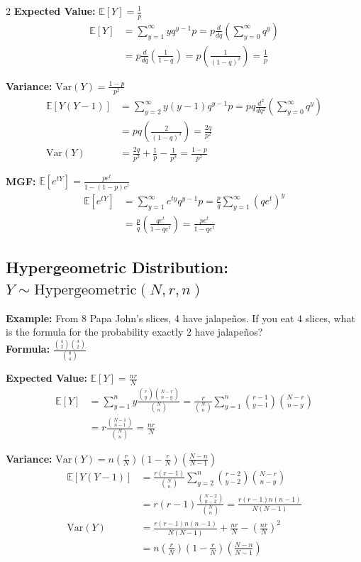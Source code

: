 \documentclass[11pt, letterpaper]{article}
\theoremstyle{definition}
\theoremstyle{remark}
\newcommand{\E}{\mathbb{E}}
\begin{document}
\begin{multicols*}{2}
\textbf{Expected Value:} $\E[Y] = \frac{1}{p}$
\begin{align*}
\E[Y] &= \sum_{y=1}^{\infty} y q^{y-1} p = p \frac{d}{dq} \left( \sum_{y=0}^{\infty} q^y \right) \\
&= p \frac{d}{dq} \left( \frac{1}{1-q} \right) = p \left( \frac{1}{(1-q)^2} \right) = \frac{1}{p}
\end{align*}

\textbf{Variance:} $\text{Var}(Y) = \frac{1-p}{p^2}$
\begin{align*}
\E[Y(Y-1)] &= \sum_{y=2}^{\infty} y(y-1) q^{y-1} p = pq \frac{d^2}{dq^2} \left( \sum_{y=0}^{\infty} q^y \right) \\
&= pq \left( \frac{2}{(1-q)^3} \right) = \frac{2q}{p^2} \\
\text{Var}(Y) &= \frac{2q}{p^2} + \frac{1}{p} - \frac{1}{p^2} = \frac{1-p}{p^2}
\end{align*}

\textbf{MGF:} $\E[e^{tY}] = \frac{pe^t}{1-(1-p)e^t}$
\begin{align*}
\E[e^{tY}] &= \sum_{y=1}^{\infty} e^{ty} q^{y-1} p = \frac{p}{q} \sum_{y=1}^{\infty} (qe^t)^y \\
&= \frac{p}{q} \left( \frac{qe^t}{1-qe^t} \right) = \frac{pe^t}{1-qe^t}
\end{align*}

\subsection{Hypergeometric Distribution: $Y \sim \text{Hypergeometric}(N, r, n)$}
\textbf{Example:} From 8 Papa John's slices, 4 have jalapeños. If you eat 4 slices, what is the formula for the probability exactly 2 have jalapeños? \\
\textbf{Formula:} $\frac{\binom{4}{2}\binom{4}{2}}{\binom{8}{4}}$

\textbf{Expected Value:} $\E[Y] = \frac{nr}{N}$
\begin{align*}
\E[Y] &= \sum_{y=1}^{n} y \frac{\binom{r}{y}\binom{N-r}{n-y}}{\binom{N}{n}} = \frac{r}{\binom{N}{n}} \sum_{y=1}^{n} \binom{r-1}{y-1}\binom{N-r}{n-y} \\
&= r \frac{\binom{N-1}{n-1}}{\binom{N}{n}} = \frac{nr}{N}
\end{align*}

\textbf{Variance:} $\text{Var}(Y) = n\left(\frac{r}{N}\right)\left(1-\frac{r}{N}\right)\left(\frac{N-n}{N-1}\right)$
\begin{align*}
\E[Y(Y-1)] &= \frac{r(r-1)}{\binom{N}{n}} \sum_{y=2}^{n} \binom{r-2}{y-2}\binom{N-r}{n-y} \\
&= r(r-1) \frac{\binom{N-2}{n-2}}{\binom{N}{n}} = \frac{r(r-1)n(n-1)}{N(N-1)} \\
\text{Var}(Y) &= \frac{r(r-1)n(n-1)}{N(N-1)} + \frac{nr}{N} - \left(\frac{nr}{N}\right)^2 \\
&= n\left(\frac{r}{N}\right)\left(1-\frac{r}{N}\right)\left(\frac{N-n}{N-1}\right)
\end{align*}


\end{multicols*}
\end{document}
